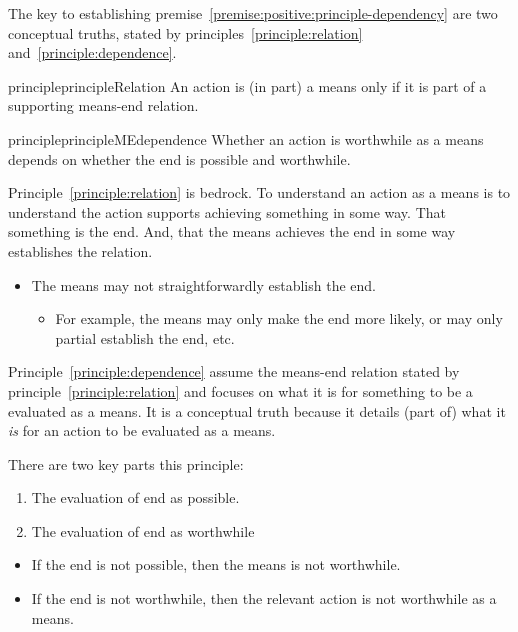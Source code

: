 \documentclass[10pt]{article}
\newcommand{\hozlinedash}[0]{%
  \noindent\hdashrule[0.5ex][c]{\textwidth}{.1pt}{2.5pt}
}
\begin{document}

\hozlinedash

The key to establishing premise~\ref{premise:positive:principle-dependency} are two conceptual truths, stated by principles~\ref{principle:relation} and~\ref{principle:dependence}.

\begin{restatable}{principle}{principleRelation}\label{principle:relation}
  An action is (in part) a means only if it is part of a supporting means-end relation.
\end{restatable}

\begin{restatable}{principle}{principleMEdependence}\label{principle:dependence}
  Whether an action is worthwhile as a means depends on whether the end is possible and worthwhile.
\end{restatable}


Principle~\ref{principle:relation} is bedrock.
To understand an action as a means is to understand the action supports achieving something in some way.
That something is the end.
And, that the means achieves the end in some way establishes the relation.
\begin{itemize}[noitemsep]
\item The means may not straightforwardly establish the end.
  \begin{itemize}[noitemsep]
  \item For example, the means may only make the end more likely, or may only partial establish the end, etc.
  \end{itemize}
\end{itemize}

Principle~\ref{principle:dependence} assume the means-end relation stated by principle~\ref{principle:relation} and focuses on what it is for something to be a evaluated as a means.
It is a conceptual truth because it details (part of) what it \emph{is} for an action to be evaluated as a means.

There are two key parts this principle:
\begin{enumerate}
\item The evaluation of end as possible.
\item The evaluation of end as worthwhile
\end{enumerate}

\begin{itemize}
\item If the end is not possible, then the means is not worthwhile.
\item If the end is not worthwhile, then the relevant action is not worthwhile as a means.
\end{itemize}
\end{document}
